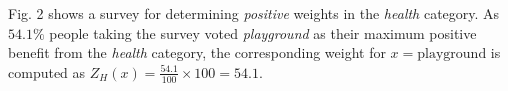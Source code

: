 \documentclass[conference]{IEEEtran}
\begin{document}
Fig. 2 shows a survey for determining \textit{positive} weights in the \textit{health} category. As $54.1\%$ people taking the survey voted \textit{playground} as their maximum positive benefit from the \textit{health} category, the corresponding weight for $x = \text{playground}$ is computed as $Z_H(x) = \frac{54.1}{100} \times 100 = 54.1$.

\begin{figure}
\hfill
{}\hfill
{}
\end{figure}
\end{document}
